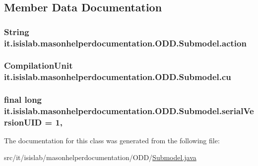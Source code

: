 \subsection{Member Data Documentation}
\hypertarget{classit_1_1isislab_1_1masonhelperdocumentation_1_1_o_d_d_1_1_submodel_a5f62abde24f5d75865b6e77cf1d15807}{
\subsubsection[{action}]{\setlength{\rightskip}{0pt plus 5cm}String it.\-isislab.\-masonhelperdocumentation.\-O\-D\-D.\-Submodel.\-action\hspace{0.3cm}{\ttfamily [private]}}}\label{classit_1_1isislab_1_1masonhelperdocumentation_1_1_o_d_d_1_1_submodel_a5f62abde24f5d75865b6e77cf1d15807}
\hypertarget{classit_1_1isislab_1_1masonhelperdocumentation_1_1_o_d_d_1_1_submodel_a39701b80035981f257dc7e09a81e3115}{
\subsubsection[{cu}]{\setlength{\rightskip}{0pt plus 5cm}Compilation\-Unit it.\-isislab.\-masonhelperdocumentation.\-O\-D\-D.\-Submodel.\-cu\hspace{0.3cm}{\ttfamily [private]}}}\label{classit_1_1isislab_1_1masonhelperdocumentation_1_1_o_d_d_1_1_submodel_a39701b80035981f257dc7e09a81e3115}
\hypertarget{classit_1_1isislab_1_1masonhelperdocumentation_1_1_o_d_d_1_1_submodel_aff94e093c834ac7fb7cc6bde2d1f2325}{
\subsubsection[{serial\-Version\-U\-I\-D}]{\setlength{\rightskip}{0pt plus 5cm}final long it.\-isislab.\-masonhelperdocumentation.\-O\-D\-D.\-Submodel.\-serial\-Version\-U\-I\-D = 1\hspace{0.3cm}{\ttfamily [static]}, {\ttfamily [private]}}}\label{classit_1_1isislab_1_1masonhelperdocumentation_1_1_o_d_d_1_1_submodel_aff94e093c834ac7fb7cc6bde2d1f2325}


The documentation for this class was generated from the following file\-:\begin{DoxyCompactItemize}
\item 
src/it/isislab/masonhelperdocumentation/\-O\-D\-D/\hyperlink{_submodel_8java}{Submodel.\-java}\end{DoxyCompactItemize}
